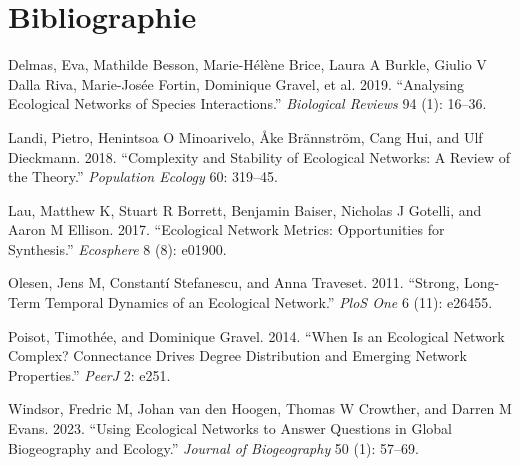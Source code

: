 \documentclass[9pt,twocolumn,twoside,]{pnas-new}
\newlength{\cslhangindent}
\newlength{\cslentryspacingunit} %
\newenvironment{CSLReferences}[2] %
 {%
  \setlength{\parindent}{0pt}
  \ifodd #1
  \let\oldpar\par
  \def\par{\hangindent=\cslhangindent\oldpar}
  \fi
  \setlength{\parskip}{#2\cslentryspacingunit}
 }%
 {}
\begin{document}
\hypertarget{bibliographie}{%
\section*{Bibliographie}\label{bibliographie}}

\hypertarget{refs}{}
\begin{CSLReferences}{1}{0}
\leavevmode{}%
Delmas, Eva, Mathilde Besson, Marie-Hélène Brice, Laura A Burkle, Giulio
V Dalla Riva, Marie-Josée Fortin, Dominique Gravel, et al. 2019.
{``Analysing Ecological Networks of Species Interactions.''}
\emph{Biological Reviews} 94 (1): 16--36.

\leavevmode{}%
Landi, Pietro, Henintsoa O Minoarivelo, Åke Brännström, Cang Hui, and
Ulf Dieckmann. 2018. {``Complexity and Stability of Ecological Networks:
A Review of the Theory.''} \emph{Population Ecology} 60: 319--45.

\leavevmode{}%
Lau, Matthew K, Stuart R Borrett, Benjamin Baiser, Nicholas J Gotelli,
and Aaron M Ellison. 2017. {``Ecological Network Metrics: Opportunities
for Synthesis.''} \emph{Ecosphere} 8 (8): e01900.

\leavevmode{}%
Olesen, Jens M, Constantí Stefanescu, and Anna Traveset. 2011.
{``Strong, Long-Term Temporal Dynamics of an Ecological Network.''}
\emph{PloS One} 6 (11): e26455.

\leavevmode{}%
Poisot, Timothée, and Dominique Gravel. 2014. {``When Is an Ecological
Network Complex? Connectance Drives Degree Distribution and Emerging
Network Properties.''} \emph{PeerJ} 2: e251.

\leavevmode{}%
Windsor, Fredric M, Johan van den Hoogen, Thomas W Crowther, and Darren
M Evans. 2023. {``Using Ecological Networks to Answer Questions in
Global Biogeography and Ecology.''} \emph{Journal of Biogeography} 50
(1): 57--69.

\end{CSLReferences}



% 
\end{document}

